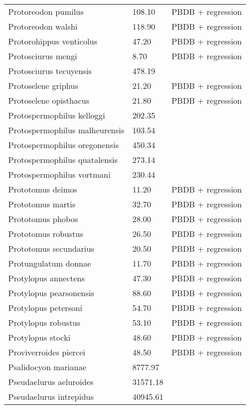 \documentclass{article}
\begin{document}
\begin{center}
\begin{longtable}{p{} p{} p{}}
    Protoreodon pumilus & 108.10 & PBDB + regression \\ 
    Protoreodon walshi & 118.90 & PBDB + regression \\ 
    Protorohippus venticolus & 47.20 & PBDB + regression \\ 
    Protosciurus mengi & 8.70 & PBDB + regression \\ 
    Protosciurus tecuyensis & 478.19 & \cite{Tomiya2013} \\ 
    Protoselene griphus & 21.20 & PBDB + regression \\ 
    Protoselene opisthacus & 21.80 & PBDB + regression \\ 
    Protospermophilus kelloggi & 202.35 & \cite{Tomiya2013} \\ 
    Protospermophilus malheurensis & 103.54 & \cite{Tomiya2013} \\ 
    Protospermophilus oregonensis & 450.34 & \cite{Tomiya2013} \\ 
    Protospermophilus quatalensis & 273.14 & \cite{Tomiya2013} \\ 
    Protospermophilus vortmani & 230.44 & \cite{Tomiya2013} \\ 
    Prototomus deimos & 11.20 & PBDB + regression \\ 
    Prototomus martis & 32.70 & PBDB + regression \\ 
    Prototomus phobos & 28.00 & PBDB + regression \\ 
    Prototomus robustus & 26.50 & PBDB + regression \\ 
    Prototomus secundarius & 20.50 & PBDB + regression \\ 
    Protungulatum donnae & 11.70 & PBDB + regression \\ 
    Protylopus annectens & 47.30 & PBDB + regression \\ 
    Protylopus pearsonensis & 88.60 & PBDB + regression \\ 
    Protylopus petersoni & 54.70 & PBDB + regression \\ 
    Protylopus robustus & 53.10 & PBDB + regression \\ 
    Protylopus stocki & 48.60 & PBDB + regression \\ 
    Proviverroides piercei & 48.50 & PBDB + regression \\ 
    Psalidocyon marianae & 8777.97 & \cite{Tomiya2013} \\ 
    Pseudaelurus aeluroides & 31571.18 & \cite{Tomiya2013} \\ 
    Pseudaelurus intrepidus & 40945.61 & \cite{Tomiya2013} \\ 

\end{longtable}
\end{center}
\end{document}
